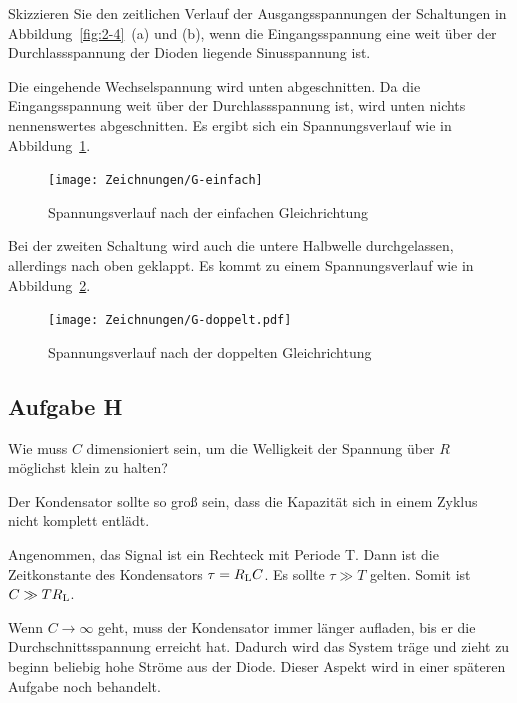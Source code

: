 \begin{problem}
	Skizzieren Sie den zeitlichen Verlauf der Ausgangsspannungen der
	Schaltungen in Abbildung~\ref{fig:2-4}~(a) und (b), wenn die
	Eingangsspannung eine weit über der Durchlassspannung der Dioden liegende
	Sinusspannung ist.
\end{problem}

Die eingehende Wechselspannung wird unten abgeschnitten. Da die
Eingangsspannung weit über der Durchlassspannung ist, wird unten nichts
nennenswertes abgeschnitten. Es ergibt sich ein Spannungsverlauf wie in
Abbildung~\ref{fig:G-einfach}.

\begin{figure}[htbp]
	\centering
	\caption{%
		Spannungsverlauf nach der einfachen Gleichrichtung
	}
	\label{fig:G-einfach}
	\texttt{[image: Zeichnungen/G-einfach]}
\end{figure}

Bei der zweiten Schaltung wird auch die untere Halbwelle durchgelassen,
allerdings nach oben geklappt. Es kommt zu einem Spannungsverlauf wie in
Abbildung~\ref{fig:G-doppelt}.

\begin{figure}[htbp]
	\centering
	\caption{%
		Spannungsverlauf nach der doppelten Gleichrichtung
	}
	\label{fig:G-doppelt}
	\texttt{[image: Zeichnungen/G-doppelt.pdf]}
\end{figure}

\FloatBarrier
\subsection{Aufgabe H}

\begin{problem}
	Wie muss $C$ dimensioniert sein, um die Welligkeit der Spannung über $R$
	möglichst klein zu halten?
\end{problem}

Der Kondensator sollte so groß sein, dass die Kapazität sich in einem Zyklus
nicht komplett entlädt.

Angenommen, das Signal ist ein Rechteck mit Periode T. Dann ist die
Zeitkonstante des Kondensators $\tau = R_\text L C$. Es sollte $\tau \gg T$
gelten. Somit ist $C \gg T R_\text L$.

Wenn $C \to \infty$ geht, muss der Kondensator immer länger aufladen, bis er
die Durchschnittsspannung erreicht hat. Dadurch wird das System träge und zieht
zu beginn beliebig hohe Ströme aus der Diode. Dieser Aspekt wird in einer
späteren Aufgabe noch behandelt.

